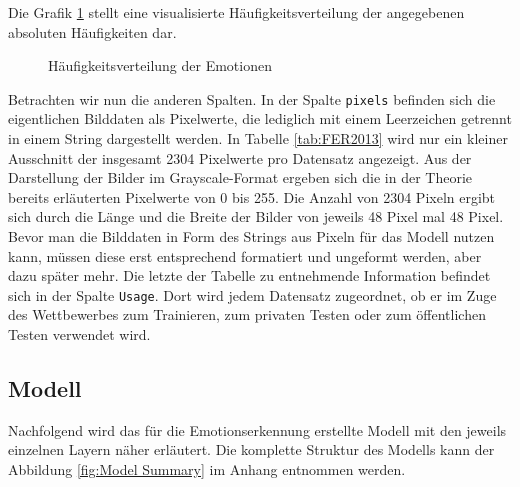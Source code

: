 \documentclass[12pt, a4paper]{report}
\begin{document}
Die Grafik \ref{fig:visualisierungferemotions} stellt eine visualisierte Häufigkeitsverteilung der angegebenen absoluten Häufigkeiten dar.
\begin{figure}[h]
  \centering
{}
  \caption{Häufigkeitsverteilung der Emotionen}
  \label{fig:visualisierungferemotions}
\end{figure}
Betrachten wir nun die anderen Spalten. In der Spalte \texttt{pixels} befinden sich die eigentlichen Bilddaten als Pixelwerte, die lediglich mit einem Leerzeichen getrennt in einem String dargestellt werden. In Tabelle \ref{tab:FER2013} wird nur ein kleiner Ausschnitt der insgesamt 2304 Pixelwerte pro Datensatz angezeigt. Aus der Darstellung der Bilder im Grayscale-Format ergeben sich die in der Theorie bereits erläuterten Pixelwerte von 0 bis 255. Die Anzahl von 2304 Pixeln ergibt sich durch die Länge und die Breite der Bilder von jeweils 48 Pixel mal 48 Pixel. Bevor man die Bilddaten in Form des Strings aus Pixeln für das Modell nutzen kann, müssen diese erst entsprechend formatiert und ungeformt werden, aber dazu später mehr. Die letzte der Tabelle zu entnehmende Information befindet sich in der Spalte \texttt{Usage}. Dort wird jedem Datensatz zugeordnet, ob er im Zuge des Wettbewerbes zum Trainieren, zum privaten Testen oder zum öffentlichen Testen verwendet wird.

\subsection{Modell}
Nachfolgend wird das für die Emotionserkennung erstellte Modell mit den jeweils einzelnen Layern näher erläutert. Die komplette Struktur des Modells kann der Abbildung \ref{fig:Model Summary} im Anhang entnommen werden.
\end{document}
